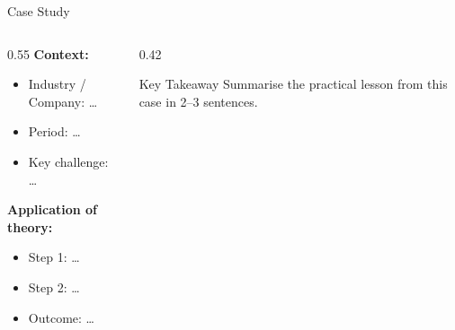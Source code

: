 \documentclass[t]{beamer}
\newcommand{\findingbox}[2]{%
    \begin{block}{#1}
        \RaggedRight #2
    \end{block}
}
\begin{document}
\begin{frame}{Case Study}
    \begin{columns}[T]
        \begin{column}{0.55\textwidth}
            \textbf{Context:}
            \begin{itemize}
                \item Industry / Company: \ldots
                \item Period: \ldots
                \item Key challenge: \ldots
            \end{itemize}

            \vspace{0.3cm}
            \textbf{Application of theory:}
            \begin{itemize}
                \item Step 1: \ldots
                \item Step 2: \ldots
                \item Outcome: \ldots
            \end{itemize}
        \end{column}
        \begin{column}{0.42\textwidth}
            \findingbox{Key Takeaway}{%
                Summarise the practical lesson from this case in 2--3 sentences.
            }
        \end{column}
    \end{columns}
\end{frame}
\end{document}
